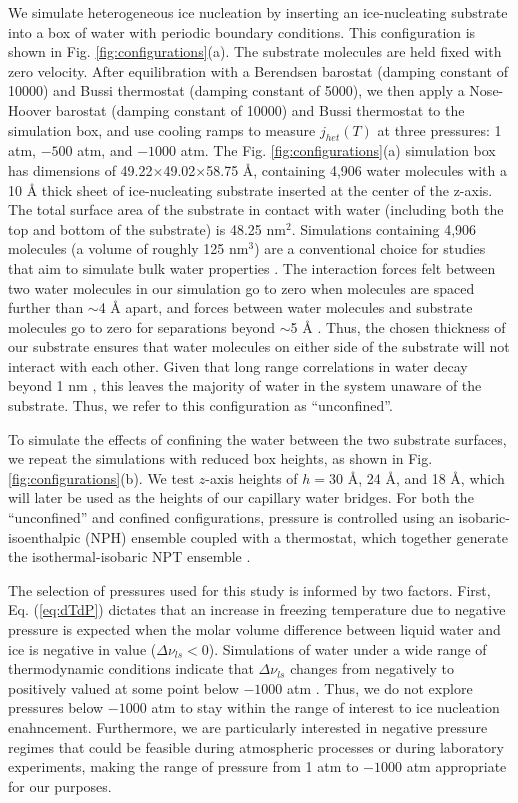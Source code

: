\documentclass[journal abbreviation, manuscript]{copernicus}
\begin{document}
We simulate heterogeneous ice nucleation by inserting an ice-nucleating substrate into a box of water with periodic boundary conditions. This configuration is shown in Fig. \ref{fig:configurations}(a). The substrate molecules are held fixed with zero velocity. After equilibration with a Berendsen barostat (damping constant of 10000) and Bussi thermostat (damping constant of 5000), we then apply a Nose-Hoover barostat (damping constant of 10000) and Bussi thermostat to the simulation box, and use cooling ramps to measure $j_{het}(T)$ at three pressures: 1 atm, $-500$ atm, and $-1000$ atm. The Fig. \ref{fig:configurations}(a) simulation box has dimensions of 49.22$\times$49.02$\times$58.75 \AA{}, containing 4,906 water molecules with a 10 \AA{} thick sheet of ice-nucleating substrate inserted at the center of the z-axis. The total surface area of the substrate in contact with water (including both the top and bottom of the substrate) is 48.25 nm$^2$. Simulations containing 4,906 molecules (a volume of roughly 125 nm$^3$) are a conventional choice for studies that aim to simulate bulk water properties \citep[e.g.,][]{molinero2009, lupi2014, li2011}. The interaction forces felt between two water molecules in our simulation go to zero when molecules are spaced further than $\sim$4 \AA{} apart, and forces between water molecules and substrate molecules go to zero for separations beyond $\sim$5 \AA{} \citep{molinero2009}. Thus, the chosen thickness of our substrate ensures that water molecules on either side of the substrate will not interact with each other. Given that long range correlations in water decay beyond 1 nm \citep{cox2015hydrophilicity, Bi2016}, this leaves the majority of water in the system unaware of the substrate. Thus, we refer to this configuration as ``unconfined''. 

To simulate the effects of confining the water between the two substrate surfaces, we repeat the simulations with reduced box heights, as shown in Fig. \ref{fig:configurations}(b). We test $z$-axis heights of $h = 30$ \AA{}, 24 \AA{}, and 18 \AA{}, which will later be used as the heights of our capillary water bridges. For both the ``unconfined'' and confined configurations, pressure is controlled using an isobaric-isoenthalpic (NPH) ensemble coupled with a thermostat, which together generate the isothermal-isobaric NPT ensemble \citep{allentildesley}.

The selection of pressures used for this study is informed by two factors. First, Eq. (\ref{eq:dTdP}) dictates that an increase in freezing temperature due to negative pressure is expected when the molar volume difference between liquid water and ice is negative in value ($\Delta \nu_{ls} < 0$). Simulations of water under a wide range of thermodynamic conditions indicate that $\Delta \nu_{ls}$ changes from negatively to positively valued at some point below $-1000$ atm \citep{bianco2021}. Thus, we do not explore pressures below $-1000$ atm to stay within the range of interest to ice nucleation enahncement. Furthermore, we are particularly interested in negative pressure regimes that could be feasible during atmospheric processes or during laboratory experiments, making the range of pressure from 1 atm to $-1000$ atm appropriate for our purposes.
\end{document}
